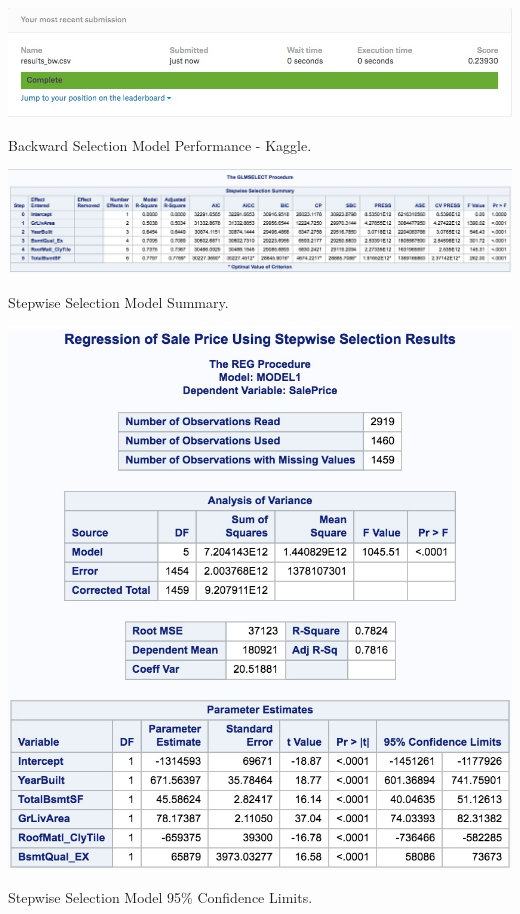 \documentclass[11pt]{scrartcl} %
\begin{document}
\hrulefill
\begin{table}[H] %
	\centering %
	\includegraphics[scale=.4]{../graphics/A2BWKaggle}
	\caption{Backward Selection Model Performance - Kaggle.} %
	\label{tab:A2BWKaggle}
\end{table}
\hrulefill
\begin{table}[H] %
	\centering %
	\includegraphics[scale=.25]{../graphics/A2SWfeatures}
	\caption{Stepwise Selection Model Summary.} %
	\label{tab:A2SWsummary}
\end{table}
\hrulefill
\begin{table}[H] %
	\centering %
	\includegraphics[scale=.3]{../graphics/A2SWCI}
	\caption{Stepwise Selection Model 95\% Confidence Limits.} %
	\label{tab:A2SWCI}
\end{table}
\end{document}

